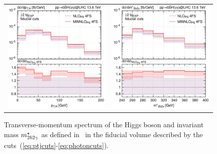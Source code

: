 \documentclass[11pt,a4paper]{article}
\begin{document}
\begin{figure}[t!]
\begin{center}
\begin{tabular}{cc}
\includegraphics[width=.45\textwidth, page=1]{plots/4fs/pt_Higgs-EXP-fid-FC.pdf}&
\includegraphics[width=.45\textwidth, page=1]{plots/4fs/mass_2b2gam-EXP-fid-FC.pdf}
\end{tabular}
\vspace*{1ex}
\caption{Transverse-momentum spectrum of the Higgs boson and invariant mass $m_{2b2\gamma}^{\star}$ as defined in~ in the fiducial volume described by the cuts~(\ref{eq:ptjcuts}-\ref{eq:photoncuts}).\label{fig:4fsFID}}
\end{center}
\end{figure}
\end{document}

